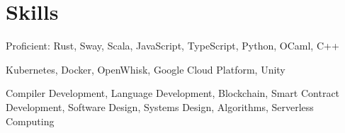 \section{Skills}

%
{}%
{}%
{}%
{Proficient: Rust, Sway, Scala, JavaScript, TypeScript, Python, OCaml, C++%
%
\newline{}
}

%
{}%
{}%
{}%
{Kubernetes, Docker, OpenWhisk, Google Cloud Platform, Unity
\newline{}
}

%
{}%
{}%
{}%
{Compiler Development, Language Development, Blockchain, Smart Contract Development,
Software Design, Systems Design, Algorithms, Serverless Computing
\newline{}
}